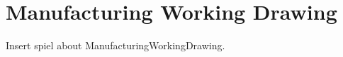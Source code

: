 

\chapter{Manufacturing Working Drawing}
Insert spiel about ManufacturingWorkingDrawing.

% 



% 

% 
